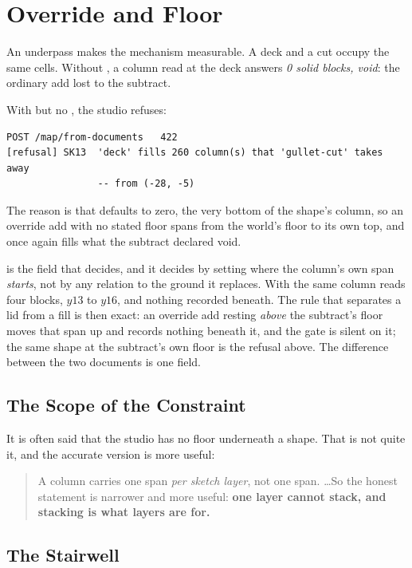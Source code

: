 \section{Override and Floor}

An underpass makes the mechanism measurable. A deck and a cut occupy the same
cells. Without , a column read at the deck answers \emph{0 solid
blocks, void}: the ordinary add lost to the subtract.

With  but no , the studio refuses:

\begin{lstlisting}
POST /map/from-documents   422
[refusal] SK13  'deck' fills 260 column(s) that 'gullet-cut' takes away
                -- from (-28, -5)
\end{lstlisting}

The reason is that  defaults to zero, the very bottom of the shape's
column, so an override add with no stated floor spans from the world's floor to
its own top, and once again fills what the subtract declared void.

 is the field that decides, and it decides by setting where the column's
own span \emph{starts}, not by any relation to the ground it replaces. With
 the same column reads four blocks, $y13$ to
$y16$, and nothing recorded beneath. The rule that separates a lid from a fill is
then exact: an override add resting \emph{above} the subtract's floor moves that
span up and records nothing beneath it, and the gate is silent on it; the same
shape at the subtract's own floor is the refusal above. The difference between the
two documents is one field.

\subsection{The Scope of the Constraint}

It is often said that the studio has no floor underneath a shape. That is not
quite it, and the accurate version is more useful:

\begin{quote}
A column carries one span \emph{per sketch layer}, not one span. \ldots So the
honest statement is narrower and more useful: \textbf{one layer cannot stack, and
stacking is what layers are for.}
\end{quote}

\subsection{The Stairwell}

